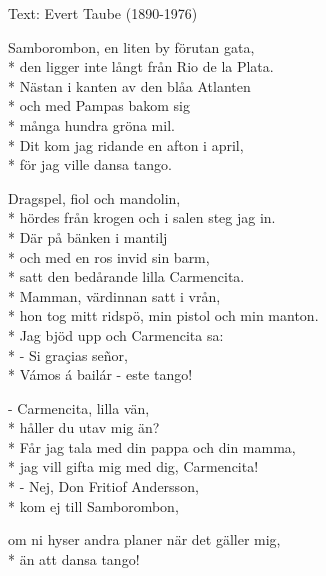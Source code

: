 \begin{SongText}
    \begin{SongInfo}
        Text: Evert Taube (1890-1976)
    \end{SongInfo}
    \begin{SongVerse}
        Samborombon, en liten by förutan gata,\\*%
        den ligger inte långt från Rio de la Plata.\\*%
        Nästan i kanten av den blåa Atlanten\\*%
        och med Pampas bakom sig\\*%
        många hundra gröna mil.\\*%
        Dit kom jag ridande en afton i april,\\*%
        för jag ville dansa tango. 
    \end{SongVerse}
    \begin{SongVerse}
        Dragspel, fiol och mandolin,\\*%
        hördes från krogen och i salen steg jag in.\\*%
        Där på bänken i mantilj\\*%
        och med en ros invid sin barm,\\*%
        satt den bedårande lilla Carmencita.\\*%
        Mamman, värdinnan satt i vrån,\\*%
        hon tog mitt ridspö, min pistol och min 
        manton.\\*%
        Jag bjöd upp och Carmencita sa:\\*%
        - Si graçias señor,\\*%
        Vámos á bailár - este tango!
    \end{SongVerse}
    \begin{SongVerse}
        - Carmencita, lilla vän,\\*%
        håller du utav mig än?\\*%
        Får jag tala med din pappa och din mamma,\\*%
        jag vill gifta mig med dig, Carmencita!\\*%
        - Nej, Don Fritiof Andersson,\\*%
        kom ej till Samborombon, 
    \end{SongVerse}
    \begin{SongVerse}
        om ni hyser andra planer när det gäller mig,\\*%
        än att dansa tango!

\end{SongVerse}
\end{SongText}
